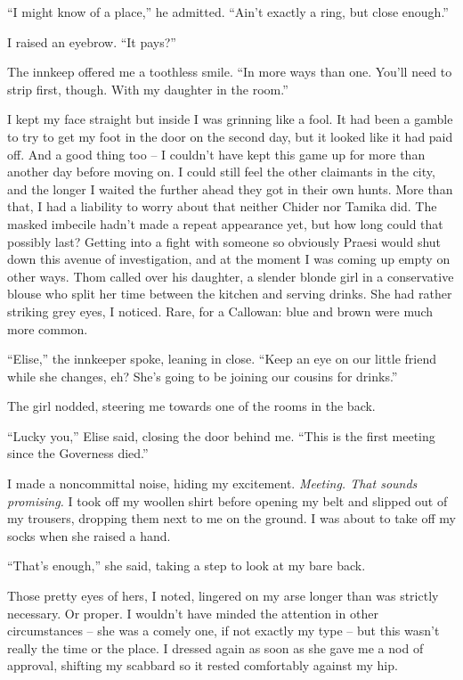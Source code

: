 \documentclass[12pt, openany]{book}
\begin{document}
“I might know of a place,” he admitted. “Ain’t exactly a ring, but close enough.”

I raised an eyebrow. “It pays?”

The innkeep offered me a toothless smile. “In more ways than one. You’ll need to strip first, though. With my daughter in the room.”

I kept my face straight but inside I was grinning like a fool. It had been a gamble to try to get my foot in the door on the second day, but it looked like it had paid off. And a good thing too – I couldn’t have kept this game up for more than another day before moving on. I could still feel the other claimants in the city, and the longer I waited the further ahead they got in their own hunts. More than that, I had a liability to worry about that neither Chider nor Tamika did. The masked imbecile hadn’t made a repeat appearance yet, but how long could that possibly last? Getting into a fight with someone so obviously Praesi would shut down this avenue of investigation, and at the moment I was coming up empty on other ways. Thom called over his daughter, a slender blonde girl in a conservative blouse who split her time between the kitchen and serving drinks. She had rather striking grey eyes, I noticed. Rare, for a Callowan: blue and brown were much more common.

“Elise,” the innkeeper spoke, leaning in close. “Keep an eye on our little friend while she changes, eh? She’s going to be joining our cousins for drinks.”

The girl nodded, steering me towards one of the rooms in the back.

“Lucky you,” Elise said, closing the door behind me. “This is the first meeting since the Governess died.”

I made a noncommittal noise, hiding my excitement. \textit{Meeting. That sounds promising. }I\textit{ }took off my woollen shirt before opening my belt and slipped out of my trousers, dropping them next to me on the ground. I was about to take off my socks when she raised a hand.

“That’s enough,” she said, taking a step to look at my bare back.

Those pretty eyes of hers, I noted, lingered on my arse longer than was strictly necessary. Or proper. I wouldn’t have minded the attention in other circumstances – she was a comely one, if not exactly my type – but this wasn’t really the time or the place. I dressed again as soon as she gave me a nod of approval, shifting my scabbard so it rested comfortably against my hip.
\end{document}
